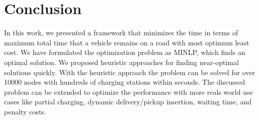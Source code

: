 \documentclass[conference]{IEEEtran}
\begin{document}
\section{Conclusion} \label{sec:CF}
In this work, we presented a framework that minimizes the
time in terms of maximum total time that a vehicle remains on a road with most optimum least cost. We have formulated the optimization problem as
MINLP, which finds an optimal solution. We proposed heuristic approaches for finding near-optimal solutions quickly. With the heuristic approach the problem can be solved for over 10000 nodes with hundreds of charging stations within seconds. The discussed problem can be
extended to optimize the performance with more reals world use cases like partial charging, dynamic delivery/pickup insertion, waiting time, and penalty costs.










\end{document}

